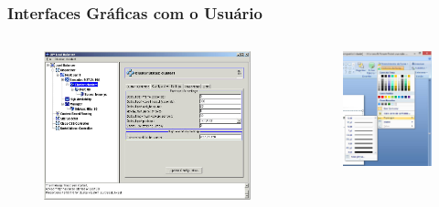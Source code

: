 \documentclass[aspectratio=169]{beamer}
\begin{document}
\begin{frame}\frametitle{Interfaces Gráficas com o Usuário}
\begin{columns}[T]
\begin{column}{0.62\linewidth}
\vspace{-5mm}
\begin{figure}[h]
	\centering
	\includegraphics[height=0.70\paperheight]{imagens/interface1.jpg}
\end{figure}
\end{column}
\begin{column}{0.38\linewidth}
\vspace{-5mm}
\begin{figure}[h]
	\centering
	\includegraphics[height=0.70\paperheight]{imagens/interface2.jpg}

\end{figure}
\end{column}
\end{columns}
\end{frame}
\end{document}
